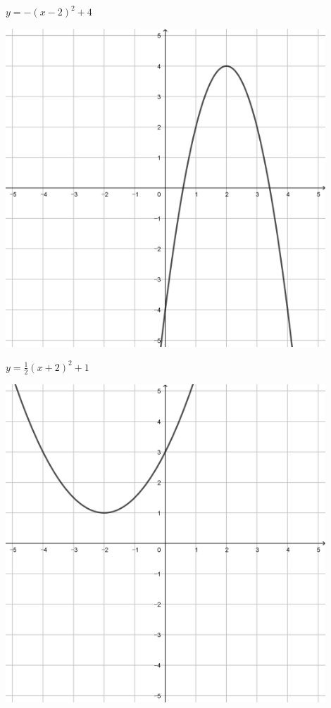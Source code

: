 \documentclass[a4paper]{oblivoir}
\begin{document}
\begin{minipage}{0.45\textwidth}\centering
\(y=-(x-2)^2+4\)
\par\bigskip\includegraphics[width=0.9\textwidth]{img/2_quadratic_19}
\end{minipage}
\begin{minipage}{0.45\textwidth}\centering
\(y=\frac12(x+2)^2+1\)
\par\bigskip\includegraphics[width=0.9\textwidth]{img/2_quadratic_20}
\end{minipage}\bigskip\bigskip\par
\end{document}
